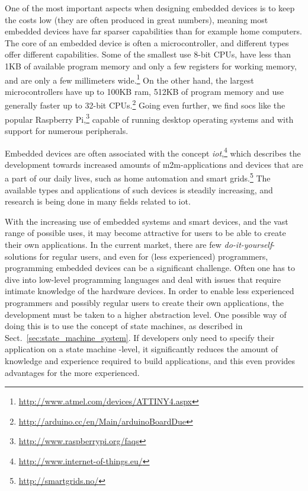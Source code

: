 One of the most important aspects when designing embedded devices is to keep the costs low (they are often produced in great numbers), meaning most embedded devices have far sparser capabilities than for example home computers. The core of an embedded device is often a microcontroller, and different types offer different capabilities. Some of the smallest use 8-bit CPUs, have less than 1KB of available program memory and only a few registers for working memory, and are only a few millimeters wide.\footnote{\url{http://www.atmel.com/devices/ATTINY4.aspx}} On the other hand, the largest microcontrollers have up to 100KB ram, 512KB of program memory and use generally faster up to 32-bit CPUs.\footnote{\url{http://arduino.cc/en/Main/arduinoBoardDue}} Going even further, we find \glspl{soc} like the popular Raspberry Pi,\footnote{\url{http://www.raspberrypi.org/faqs}} capable of running desktop operating systems and with support for numerous peripherals.

Embedded devices are often associated with the concept \emph{\gls{iot}},\footnote{\url{http://www.internet-of-things.eu/}} which describes the development towards increased amounts of \gls{m2m}-applications and devices that are a part of our daily lives, such as home automation and smart grids.\footnote{\url{http://smartgrids.no/}} The available types and applications of such devices is steadily increasing, and research is being done in many fields related to \gls{iot}.

With the increasing use of embedded systems and smart devices, and the vast range of possible uses, it may become attractive for users to be able to create their own applications. In the current market, there are few \emph{do-it-yourself}-solutions for regular users, and even for (less experienced) programmers, programming embedded devices can be a significant challenge. Often one has to dive into low-level programming languages and deal with issues that require intimate knowledge of the hardware devices. In order to enable less experienced programmers and possibly regular users to create their own applications, the development must be taken to a higher abstraction level. One possible way of doing this is to use the concept of state machines, as described in Sect.~\ref{sec:state_machine_system}. If developers only need to specify their application on a state machine -level, it significantly reduces the amount of knowledge and experience required to build applications, and this even provides advantages for the more experienced.